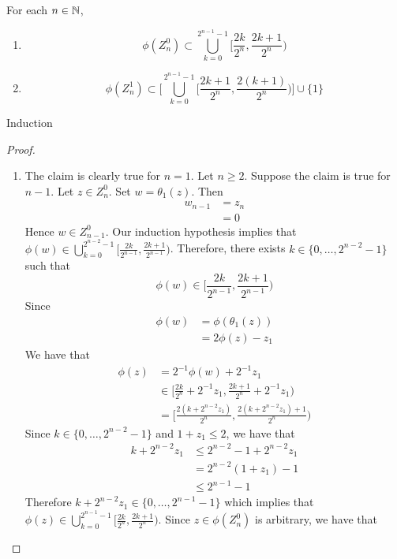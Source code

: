 \documentclass{book}
\begin{document}
	
	\begin{ex}  
		For each $n \in \mathbb{N}$, 
		\begin{enumerate}
			\item $$\phi(Z_n^0) \subset \bigcup\limits_{k =0}^{2^{n-1} -1} \bigg[ \frac{2k}{2^n}, \frac{2k+1}{2^n} \bigg)$$
			\item $$\phi(Z_n^1) \subset \bigg[ \bigcup\limits_{k =0}^{2^{n-1} -1} \bigg[ \frac{2k + 1}{2^n}, \frac{2(k+1)}{2^n} \bigg) \bigg] \cup \{1\}$$
		\end{enumerate}
		 Induction
	\end{ex}
	
	\begin{proof}\
		\begin{enumerate}
			\item The claim is clearly true for $n = 1$. Let $n \geq 2$. Suppose the claim is true for $n-1$. Let $z \in Z_n^0$. Set $w = \theta_1 (z)$. 
			Then 
			\begin{align*}
				w_{n-1} 
				& = z_n \\
				& = 0
			\end{align*}
			Hence $w \in Z_{n-1}^0$. Our induction hypothesis implies that $\phi(w) \in \bigcup\limits_{k =0}^{2^{n-2} -1} \bigg[ \frac{2k}{2^{n-1}}, \frac{2k+1}{2^{n-1}} \bigg)$.
			Therefore, there exists $k \in \{0, \ldots, 2^{n-2} -1\}$ such that $$\phi(w) \in \bigg[ \frac{2k}{2^{n-1}}, \frac{2k+1}{2^{n-1}} \bigg)$$ Since 
			\begin{align*}
				\phi(w) 
				& = \phi(\theta_1(z)) \\
				& = 2 \phi(z) - z_1
			\end{align*}
			We have that
			\begin{align*}
				\phi(z) 
				& = 2^{-1}\phi(w) + 2^{-1} z_1 \\
				& \in \bigg[ \frac{2k}{2^n} + 2^{-1}z_1, \frac{2k + 1}{2^n} +  2^{-1}z_1 \bigg) \\
				& = \bigg[ \frac{2(k+ 2^{n-2}z_1)}{2^n}, \frac{2(k+ 2^{n-2}z_1) + 1}{2^n} \bigg) 
			\end{align*}
			Since $k \in \{0, \ldots, 2^{n-2} -1\}$ and $1 + z_1 \leq 2$, we have that 
			\begin{align*}
				k+ 2^{n-2}z_1 
				& \leq 2^{n-2} -1 + 2^{n-2}z_1  \\
				&  =  2^{n-2}(1 + z_1) - 1 \\
				& \leq 2^{n-1} - 1
			\end{align*} 
			Therefore $	k+ 2^{n-2}z_1 \in \{0, \ldots, 2^{n-1} - 1\}$ which implies that $\phi(z) \in  \bigcup\limits_{k =0}^{2^{n-1} -1} \bigg[ \frac{2k}{2^n}, \frac{2k+1}{2^n} \bigg)$. Since $z \in \phi(Z_n^0)$ is arbitrary, we have that

\end{enumerate}
\end{proof}
\end{document}
